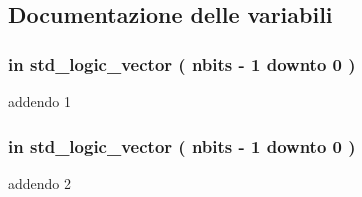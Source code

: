 \subsection{Documentazione delle variabili}
\hypertarget{group___adder_gad6ed6073f8ded668a403a0f7d85c53e8}{
\subsubsection[{add1}]{ {\bfseries \textcolor{vhdlchar}{in}\textcolor{vhdlchar}{ }} {\bfseries \textcolor{vhdlchar}{std\+\_\+logic\+\_\+vector}\textcolor{vhdlchar}{ }\textcolor{vhdlchar}{(}\textcolor{vhdlchar}{ }\textcolor{vhdlchar}{ }\textcolor{vhdlchar}{ }\textcolor{vhdlchar}{ }{\bfseries {\bf nbits}} \textcolor{vhdlchar}{-\/}\textcolor{vhdlchar}{ } \textcolor{vhdldigit}{1} \textcolor{vhdlchar}{ }\textcolor{vhdlchar}{downto}\textcolor{vhdlchar}{ }\textcolor{vhdlchar}{ } \textcolor{vhdldigit}{0} \textcolor{vhdlchar}{ }\textcolor{vhdlchar}{)}\textcolor{vhdlchar}{ }} \hspace{0.3cm}{\ttfamily [Port]}}}\label{group___adder_gad6ed6073f8ded668a403a0f7d85c53e8}


addendo 1 

\hypertarget{group___adder_gabf87ad241134c4d313c708910677575e}{
\subsubsection[{add2}]{ {\bfseries \textcolor{vhdlchar}{in}\textcolor{vhdlchar}{ }} {\bfseries \textcolor{vhdlchar}{std\+\_\+logic\+\_\+vector}\textcolor{vhdlchar}{ }\textcolor{vhdlchar}{(}\textcolor{vhdlchar}{ }\textcolor{vhdlchar}{ }\textcolor{vhdlchar}{ }\textcolor{vhdlchar}{ }{\bfseries {\bf nbits}} \textcolor{vhdlchar}{-\/}\textcolor{vhdlchar}{ } \textcolor{vhdldigit}{1} \textcolor{vhdlchar}{ }\textcolor{vhdlchar}{downto}\textcolor{vhdlchar}{ }\textcolor{vhdlchar}{ } \textcolor{vhdldigit}{0} \textcolor{vhdlchar}{ }\textcolor{vhdlchar}{)}\textcolor{vhdlchar}{ }} \hspace{0.3cm}{\ttfamily [Port]}}}\label{group___adder_gabf87ad241134c4d313c708910677575e}


addendo 2 

